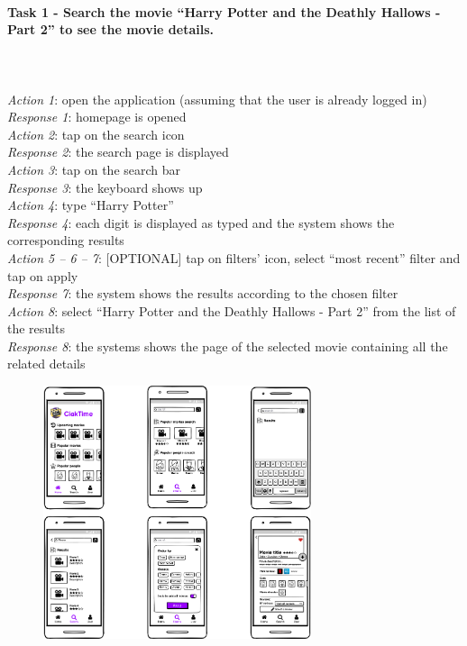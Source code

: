 \documentclass[12pt, a4paper]{article}
\numberwithin{figure}{section}
\begin{document}
\paragraph{Task 1 - Search the movie “Harry Potter and the Deathly Hallows - Part 2” to see the movie details.}\mbox{}\\\\
\textit{Action 1}: open the application (assuming that the user is already logged in)\\ 
\textit{Response 1}: homepage is opened\\
\textit{Action 2}: tap on the search icon\\
\textit{Response 2}: the search page is displayed\\
\textit{Action 3}: tap on the search bar\\
\textit{Response 3}: the keyboard shows up\\
\textit{Action 4}: type “Harry Potter”\\
\textit{Response 4}: each digit is displayed as typed and the system shows the corresponding results\\
\textit{Action 5 – 6 – 7}: [OPTIONAL] tap on filters’ icon, select “most recent” filter and tap on apply\\
\textit{Response 7}: the system shows the results according to the chosen filter\\
\textit{Action 8}: select “Harry Potter and the Deathly Hallows - Part 2” from the list of the results\\
\textit{Response 8}: the systems shows the page of the selected movie containing all the related details
\begin{figure}[H]
	\centering
	\includegraphics[width=0.7\textwidth]{images/mockupSearch.png}\\
\end{figure}
\end{document}

